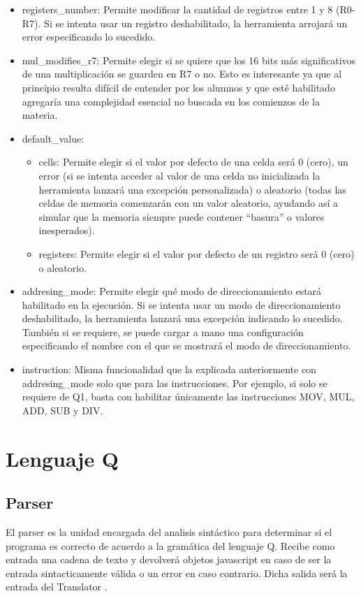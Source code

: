 \begin{itemize}
  \item registers\_number: Permite modificar la cantidad de registros entre 1 y 8 (R0-R7). Si se intenta usar un registro deshabilitado, la herramienta arrojará un error especificando lo sucedido.
  \item mul\_modifies\_r7: Permite elegir si se quiere que los 16 bits más significativos de una multiplicación se guarden en R7 o no. Esto es interesante ya que al principio resulta difícil de entender por los alumnos y que esté habilitado agregaría una complejidad esencial no buscada en los comienzos de la materia.
  \item default\_value: 
  \begin{itemize}
    \item cells: Permite elegir si el valor por defecto de una celda será 0 (cero), un error (si se intenta acceder al valor de una celda no inicializada la herramienta lanzará una excepción personalizada) o aleatorio (todas las celdas de memoria comenzarán con un valor aleatorio, ayudando así a simular que la memoria siempre puede contener “basura” o valores inesperados).
    \item registers: Permite elegir si el valor por defecto de un registro será 0 (cero) o aleatorio.
  \end{itemize}
  \item addresing\_mode: Permite elegir qué modo de direccionamiento estará habilitado en la ejecución. Si se intenta usar un modo de direccionamiento deshabilitado, la herramienta lanzará una excepción indicando lo sucedido. También si se requiere, se puede cargar a mano una configuración especificando el nombre con el que se mostrará el modo de direccionamiento.
  \item instruction: Misma funcionalidad que la explicada anteriormente con addresing\_mode solo que para las instrucciones. 
  Por ejemplo, si solo se requiere de Q1, basta con habilitar únicamente las instrucciones MOV, MUL, ADD, SUB y DIV.
\end{itemize}

\section{Lenguaje Q}

\subsection{Parser}
El parser es la unidad encargada del analisis sintáctico para determinar si el programa es correcto de acuerdo a la gramática del lenguaje Q. 
Recibe como entrada una cadena de texto y devolverá objetos javascript en caso de ser la entrada sintacticamente válida o un error en caso 
contrario. Dicha salida será la entrada del Translator .

